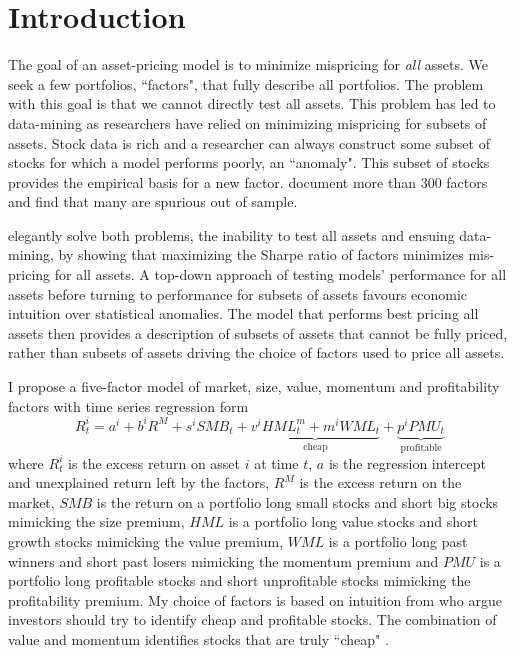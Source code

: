 
\section*{Introduction}

The goal of an asset-pricing model is to minimize mispricing for
\emph{all} assets.
We seek a few portfolios, ``factors", that fully describe all portfolios.
The problem with this goal is that we cannot directly test all assets.
This problem has led to data-mining as researchers have relied on minimizing
mispricing for subsets of assets.
Stock data is rich and a researcher can always construct some subset of stocks
for which a model performs poorly, an ``anomaly".
This subset of stocks provides the empirical basis for a new factor.
\textcite{harvey2016and} document more than 300 factors and
\textcite{linnainmaa2016history} find that many are spurious out of sample.

\textcite{barillas2016alpha} elegantly solve both problems,
the inability to test all assets and ensuing data-mining,
by showing that maximizing the Sharpe ratio of factors minimizes
mis-pricing for all assets.
A top-down approach of testing models' performance for all assets before
turning to performance for subsets of assets favours economic intuition over
statistical anomalies.
The model that performs best pricing all assets then provides a description
of subsets of assets that cannot be fully priced,
rather than subsets of assets driving the choice of factors used to price all
assets.

I propose a five-factor model of market, size, value, momentum and
profitability factors with time series regression form
\begin{equation} \label{eq:B16}
R_t^i = a^i+b^iR^M+s^iSMB_t+
\underbrace{v^iHML_t^m+m^iWML_t}_\text{cheap}+
\underbrace{p^iPMU_t}_\text{profitable}
\end{equation}
where $R_t^i$ is the excess return on asset $i$ at time $t$, $a$ is the
regression intercept and unexplained return left by the factors, $R^M$ is the
excess return on the market, $SMB$ is the return on a portfolio long small
stocks and short big stocks mimicking the size premium, $HML$ is a portfolio
long value stocks and short growth stocks mimicking the value premium, $WML$ is
a portfolio long past winners and short past losers mimicking the momentum
premium and $PMU$ is a portfolio long profitable stocks and short unprofitable
stocks mimicking the profitability premium.
My choice of factors is based on intuition from \textcite{graham1934security}
who argue investors should try to identify cheap and profitable stocks.
The combination of value and momentum identifies stocks that are truly ``cheap"
\parencite{kok2017facts}.

